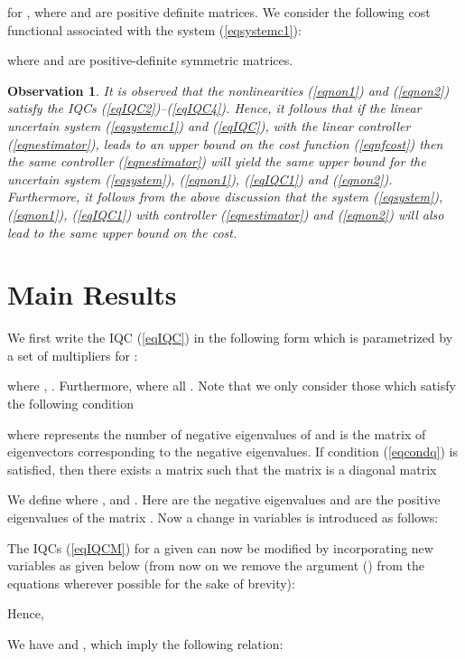 \documentclass[twocolumn]{autart}
\newtheorem{observation}{Observation}                                                \DeclareMathOperator*{\infy}{inf}
\begin{document}
for  , where  and  are positive definite matrices. We consider the following cost functional associated with the system (\ref{eqsystemc1}):

where  and  are positive-definite symmetric matrices. 
\begin{observation}\label{Obs1}
It is observed that the nonlinearities (\ref{eqnon1}) and (\ref{eqnon2}) satisfy the IQCs (\ref{eqIQC2})--(\ref{eqIQC4}). Hence, it follows that if the linear uncertain system (\ref{eqsystemc1}) and (\ref{eqIQC}), with the linear controller (\ref{eqnestimator}), leads to an upper bound on the cost function (\ref{eqnfcost}) then the same controller (\ref{eqnestimator}) will yield the same upper bound for the uncertain system (\ref{eqsystem}), (\ref{eqnon1}), (\ref{eqIQC1}) and (\ref{eqnon2}). Furthermore, it follows from the above discussion that the system (\ref{eqsystem}), (\ref{eqnon1}), (\ref{eqIQC1}) with controller (\ref{eqnestimator}) and (\ref{eqnon2}) will also lead to the same upper bound on the cost.
\end{observation}
\section{Main Results}\label{sec:main}
We first write the IQC (\ref{eqIQC}) in the following form which is parametrized by a set of multipliers  for :

where , . Furthermore,  where all . Note that we only consider those  which satisfy the following condition

where   represents the number of negative eigenvalues of   and  is the matrix of eigenvectors corresponding to the negative eigenvalues. 
If condition (\ref{eqcondq}) is satisfied, then there exists a matrix  such that the matrix  is a diagonal matrix 

We define 
where ,  and  . Here  are the negative eigenvalues and  are the positive eigenvalues of the matrix .
Now a change in variables is introduced as follows:


The IQCs (\ref{eqIQCM}) for a given  can now  be modified by incorporating new variables as given below (from now on we remove the argument () from the equations wherever possible for the sake of brevity):
\begin{small}
\end{small}
Hence,
\begin{small}
\end{small}  

We have  and , which imply the following relation:
\end{document}
